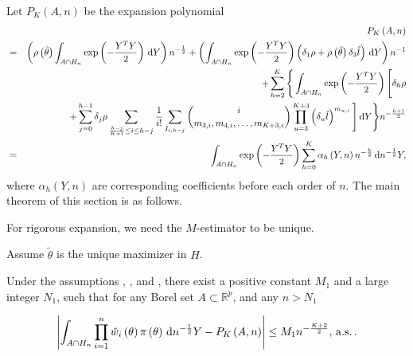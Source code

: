 \begin{comment}
the formula is wrong, need a new one. 
\end{comment}
Let $P_{K}\left(A,n\right)$ be the expansion polynomial 
\begin{eqnarray*}
 &  & P_{K}\left(A,n\right)\\
 & = & \left(\rho\left(\tilde{\theta}\right)\int_{A\cap H_{n}}\exp\left(-\frac{Y^{T}Y}{2}\right)\,\mathrm{d} Y\right)n^{-\frac{1}{2}}+\left(\int_{A\cap H_{n}}\exp\left(-\frac{Y^{T}Y}{2}\right)\left(\delta_{1}\rho+\rho\left(\tilde{\theta}\right)\delta_{3}\hat{l}\right)\,\mathrm{d} Y\right)n^{-1}\\
 &  & +\sum_{h=2}^{K}\Bigg\{\int_{A\cap H_{n}}\exp\left(-\frac{Y^{T}Y}{2}\right)\Bigg[\delta_{h}\rho\\
 &  & +\sum_{j=0}^{h-1}\delta_{j}\rho\sum_{\frac{h-j}{K+1}\le i\le h-j}\frac{1}{i!}\sum_{I_{i,h-j}}\binom{i}{m_{3,i},m_{4,i},\ldots,m_{K+3,i}}\prod_{u=3}^{K+3}\left(\delta_{u}\hat{l}\right)^{m_{u,i}}\Bigg]\,\mathrm{d} Y\Bigg\} n^{-\frac{h+1}{2}}\\
 & = & \int_{A\cap H_{n}}\exp\left(-\frac{Y^{T}Y}{2}\right)\sum_{h=0}^{K}\alpha_{h}\left(Y,n\right)n^{-\frac{h}{2}}\,\mathrm{d} n^{-\frac{1}{2}}Y,
\end{eqnarray*}
where $\alpha_{h}\left(Y,n\right)$ are corresponding coefficients
before each order of $n$. %
The main theorem of this section is as follows.
\begin{comment}
add normal case and multivariate case
\end{comment}
For rigorous expansion, we need the $M$-estimator to be unique.
\begin{assumption}
\label{assu:uniq-m-est-mult}
Assume $\tilde{\theta}$ is the unique maximizer in $H$.
\end{assumption}
\begin{thm}
\label{thm:main-theorem}Under the assumptions ,
,  and ,
there exist a positive constant $M_{1}$ and a large integer $N_{1}$,
such that for any Borel set $A\subset\mathbb{R}^{p}$, and any $n>N_{1}$%
\begin{comment}
add subscript to constant
\end{comment}
{} 
\[
\left|\int_{A\cap H_{n}}\prod_{i=1}^{n}\hat{w}_{i}\left(\theta\right)\pi\left(\theta\right)\,\mathrm{d} n^{-\frac{1}{2}}Y-P_{K}\left(A,n\right)\right|\le M_{1}n^{-\frac{K+2}{2}},\,\mathrm{a.s.}\,.
\]

\end{thm}
